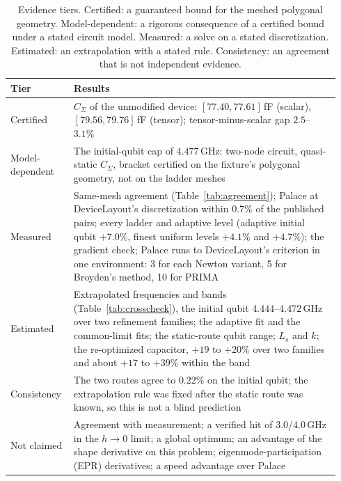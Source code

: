 \documentclass{anvil-paper}
\begin{document}
\begin{table}[htbp]
  \centering
  \caption{Evidence tiers. Certified: a guaranteed bound for the meshed
  polygonal geometry. Model-dependent: a rigorous consequence of a certified
  bound under a stated circuit model. Measured: a solve on a stated
  discretization. Estimated: an extrapolation with a stated rule.
  Consistency: an agreement that is not independent evidence.}
  \label{tab:tiers}
  \footnotesize
  \begin{tabular}{@{}>{\raggedright\arraybackslash}p{0.17\linewidth}>{\raggedright\arraybackslash}p{0.77\linewidth}@{}}
    \toprule
    Tier & Results \\
    \midrule
    Certified & $C_\Sigma$ of the unmodified device: $[77.40, 77.61]$\,fF (scalar), $[79.56, 79.76]$\,fF (tensor); tensor-minus-scalar gap $2.5$--$3.1\%$ \\
    Model-dependent & The initial-qubit cap of $4.477$\,GHz: two-node circuit, quasi-static $C_\Sigma$, bracket certified on the fixture's polygonal geometry, not on the ladder meshes \\
    Measured & Same-mesh agreement (Table~\ref{tab:agreement}); Palace at DeviceLayout's discretization within $0.7\%$ of the published pairs; every ladder and adaptive level (adaptive initial qubit $+7.0\%$, finest uniform levels $+4.1\%$ and $+4.7\%$); the gradient check; Palace runs to DeviceLayout's criterion in one environment: 3 for each Newton variant, 5 for Broyden's method, 10 for PRIMA \\
    Estimated & Extrapolated frequencies and bands (Table~\ref{tab:crosscheck}), the initial qubit $4.444$--$4.472$\,GHz over two refinement families; the adaptive fit and the common-limit fits; the static-route qubit range; $L_s$ and $k$; the re-optimized capacitor, $+19$ to $+20\%$ over two families and about $+17$ to $+39\%$ within the band \\
    Consistency & The two routes agree to $0.22\%$ on the initial qubit; the extrapolation rule was fixed after the static route was known, so this is not a blind prediction \\
    Not claimed & Agreement with measurement; a verified hit of $3.0$/$4.0$\,GHz in the $h \to 0$ limit; a global optimum; an advantage of the shape derivative on this problem; eigenmode-participation (EPR) derivatives; a speed advantage over Palace \\
    \bottomrule
  \end{tabular}
\end{table}
\end{document}
